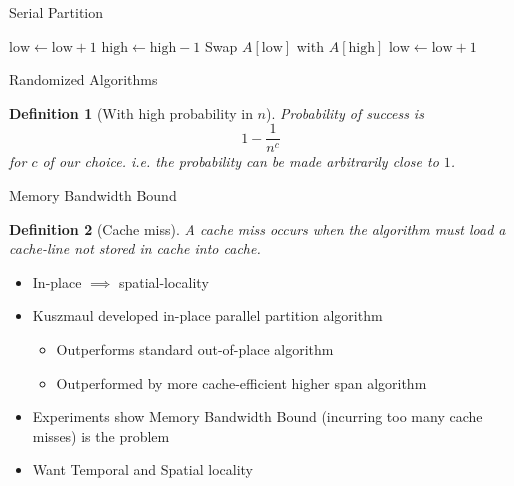 \documentclass[x11names, svgnames, rgb]{beamer}
\newtheorem{defin}{Definition}
\begin{document}
\begin{frame}[t]{Serial Partition}  %
	\begin{algorithmic}
			\State $\text{low} \gets \text{low}+1$
		\EndWhile
		\State $\text{high} \gets \text{high}-1$
		\EndWhile
		\State Swap $A[\text{low}]$ with $A[\text{high}]$
	\EndWhile
	\State $\text{low} \gets \text{low}+1$
	\EndIf
\end{algorithmic}

\end{frame}

\begin{frame}[t]{Randomized Algorithms}
	\begin{defin}[With high probability in $n$]
		Probability of success is 
		$$1-\frac{1}{n^c}$$
		for $c$ of our choice. i.e. the probability can be made arbitrarily close to $1$.
	\end{defin}
\end{frame}

\begin{frame}[t]{Memory Bandwidth Bound}
	\begin{defin}[Cache miss]
		A cache miss occurs when the algorithm must load a cache-line not stored in cache into cache.
	\end{defin}	
	\begin{itemize}
		\item In-place $\implies$ spatial-locality  
		\item Kuszmaul developed in-place parallel partition algorithm
			\begin{itemize}
				\item Outperforms standard out-of-place algorithm
				\item Outperformed by more cache-efficient higher span algorithm
			\end{itemize}
		\item Experiments show Memory Bandwidth Bound (incurring too many cache misses) is the problem
		\item Want Temporal and Spatial locality
	\end{itemize}
\end{frame}
\end{document}
